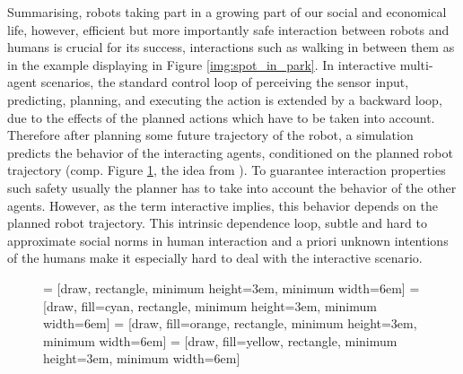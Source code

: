 Summarising, robots taking part in a growing part of our social and economical life, however, efficient but more importantly safe interaction between robots and humans is crucial for its success, interactions such as walking in between them as in the example displaying in Figure \ref{img:spot_in_park}.
\newline
In interactive multi-agent scenarios, the standard control loop of perceiving the sensor input, predicting, planning, and executing the action \cite{Siegwart2011} is extended by a backward loop, due to the effects of the planned actions which have to be taken into account. Therefore after planning some future trajectory of the robot, a simulation predicts the behavior of the interacting agents, conditioned on the planned robot trajectory (comp. Figure \ref{fig:control_loop_interactive}, the idea from \cite{Romanski2019}). To guarantee interaction properties such safety usually the planner has to take into account the behavior of the other agents. However, as the term interactive implies, this behavior depends on the planned robot trajectory. This intrinsic dependence loop, subtle and hard to approximate social norms in human interaction and a priori unknown intentions of the humans make it especially hard to deal with the interactive scenario. 

\begin{figure}
\begin{center}
 = [draw, rectangle, minimum height=3em, minimum width=6em]
 = [draw, fill=cyan, rectangle, minimum height=3em, minimum width=6em]
 = [draw, fill=orange, rectangle, minimum height=3em, minimum width=6em]
 = [draw, fill=yellow, rectangle, minimum height=3em, minimum width=6em]
\label{fig:control_loop_interactive}
\end{center}
\end{figure}

